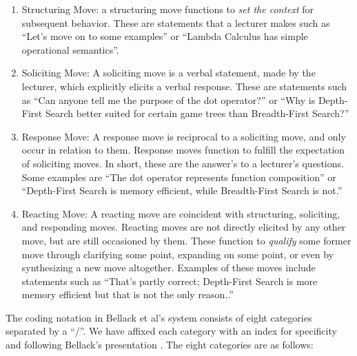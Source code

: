 \documentclass[conference]{IEEEtran}
\begin{document}
\begin{enumerate}[P1.]

  \item \label{contrib:struct}
    Structuring Move: a structuring move functions to \emph{set the context} for
    subsequent behavior. These are statements that a lecturer makes such as
    ``Let's move on to some examples'' or ``Lambda Calculus has simple
    operational semantics''.
  
  \item \label{contrib:solicit}
    Soliciting Move: A soliciting move is a verbal statement, made by the
    lecturer, which explicitly elicits a verbal response. These are statements
    such as ``Can anyone tell me the purpose of the dot operator?'' or ``Why is
    Depth-First Search better suited for certain game trees than Breadth-First Search?''

   \item \label{contrib:response}
     Response Move: A response move is reciprocal to a soliciting move, and only
     occur in relation to them. Response moves function to fulfill the
     expectation of soliciting moves. In short, these are the answer's to a
     lecturer's questions. Some examples are ``The dot operator represents
     function composition'' or ``Depth-First Search is memory efficient, while
     Breadth-First Search is not.''

   \item \label{contrib:react}
     Reacting Move: A reacting move are coincident with structuring, soliciting,
     and responding moves. Reacting moves are not directly elicited by any other
     move, but are still occasioned by them. These function to \emph{qualify}
     some former move through clarifying some point, expanding on some point, or
     even by synthesizing a new move altogether. Examples of these moves include
     statements such as ``That's partly correct; Depth-First Search is more
     memory efficient but that is not the only reason..''

\end{enumerate}

The coding notation in Bellack et al's system consists of eight categories
separated by a ``/''. We have affixed each category with an index for
specificity and following Bellack's presentation . The eight categories are as
follows:
\end{document}
